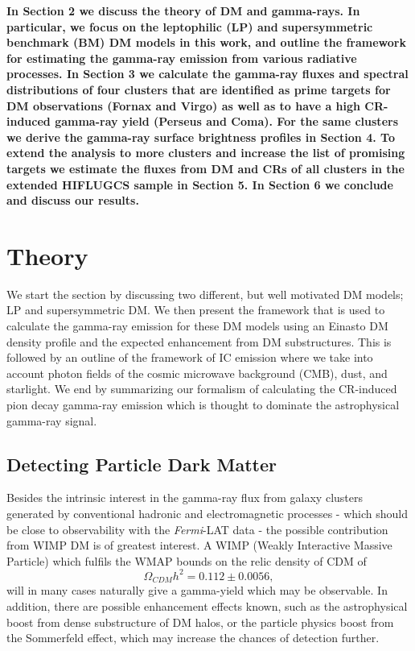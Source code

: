 \documentclass[10pt,aps,pra,reprint,amsmath,amsfonts,amssymb,showpacs,nofootinbib,floatfix]{revtex4-1}
\def\C#1{{\bf #1}}
\newcommand{\Fermi}{{\em Fermi}\xspace}
\begin{document}
\C{In Section 2 we discuss the theory of DM and gamma-rays. In
particular, we focus on the leptophilic (LP) and supersymmetric
benchmark (BM) DM models in this work, and outline the framework for
estimating the gamma-ray emission from various radiative processes. In
Section 3 we calculate the gamma-ray fluxes and spectral distributions
of four clusters that are identified as prime targets for DM
observations (Fornax and Virgo) as well as to have a high CR-induced
gamma-ray yield (Perseus and Coma). For the same clusters we derive
the gamma-ray surface brightness profiles in Section 4. To extend the
analysis to more clusters and increase the list of promising targets we
estimate the fluxes from DM and CRs of all clusters in the extended
HIFLUGCS sample in Section 5. In Section 6 we conclude and discuss our
results.}



\section{Theory}
\label{sect:theory}
We start the section by discussing two different, but well motivated
DM models; LP and supersymmetric DM. We then present the framework
that is used to calculate the gamma-ray emission for these DM models
using an Einasto DM density profile and the expected enhancement from
DM substructures. This is followed by an outline of the framework of
IC emission where we take into account photon fields of the cosmic
microwave background (CMB), dust, and starlight. We end by summarizing
our formalism of calculating the CR-induced pion decay gamma-ray
emission which is thought to dominate the astrophysical gamma-ray
signal.


\subsection{Detecting Particle Dark Matter}
\label{sect:PF}
Besides the intrinsic interest in the gamma-ray flux from galaxy
clusters generated by conventional hadronic and electromagnetic
processes - which should be close to observability with the \Fermi-LAT
data
\cite{1997ApJ...487..529B,2007A&A...473...41E,2010MNRAS.409..449P} -
the possible contribution from WIMP DM is of greatest interest. A WIMP
(Weakly Interactive Massive Particle) which fulfils the WMAP bounds on
the relic density of CDM of \cite{Komatsu:2010fb}
$$\Omega_{CDM}h^2=0.112\pm 0.0056,$$ will in many cases naturally give
a gamma-yield which may be observable. In addition, there are possible
enhancement effects known, such as the astrophysical boost from dense
substructure of DM halos, or the particle physics boost from the
Sommerfeld effect, which may increase the chances of detection
further.
\end{document}

